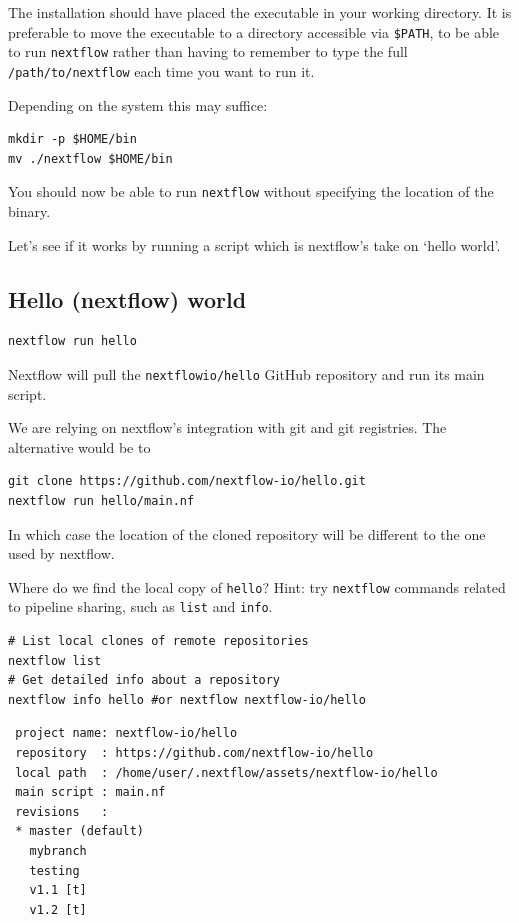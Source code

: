 The installation should have placed the executable in your working directory.
It is preferable to move the executable to a directory accessible via \texttt{\$PATH}, 
to be able to run \texttt{nextflow} rather than having to remember 
to type the full \texttt{/path/to/nextflow} each time you want to run it.

Depending on the system this may suffice:

\begin{steps}
\begin{lstlisting}
mkdir -p $HOME/bin
mv ./nextflow $HOME/bin
\end{lstlisting}
\end{steps}

You should now be able to run \texttt{nextflow} without specifying the location of the binary.

Let's see if it works by running a script which is nextflow's take on `hello world'.

\subsection{Hello (nextflow) world}

\begin{steps}
\begin{lstlisting}
nextflow run hello
\end{lstlisting}
\end{steps}

Nextflow will pull the \texttt{nextflowio/hello} GitHub repository and run its main script.

\begin{note}
We are relying on nextflow's integration with git and git registries. 
The alternative would be to
\begin{lstlisting}
git clone https://github.com/nextflow-io/hello.git
nextflow run hello/main.nf
\end{lstlisting}
In which case the location of the cloned repository will be different to the one used by nextflow.
\end{note}

\begin{questions}
Where do we find the local copy of \texttt{hello}? Hint: try \texttt{nextflow} commands related to pipeline sharing, such as \texttt{list} and \texttt{info}.
\begin{answer}
\begin{lstlisting}
# List local clones of remote repositories
nextflow list
# Get detailed info about a repository 
nextflow info hello #or nextflow nextflow-io/hello
\end{lstlisting}

\begin{verbatim}
 project name: nextflow-io/hello
 repository  : https://github.com/nextflow-io/hello
 local path  : /home/user/.nextflow/assets/nextflow-io/hello
 main script : main.nf
 revisions   : 
 * master (default)
   mybranch
   testing
   v1.1 [t]
   v1.2 [t]
\end{verbatim}
\end{answer}
\end{questions}


